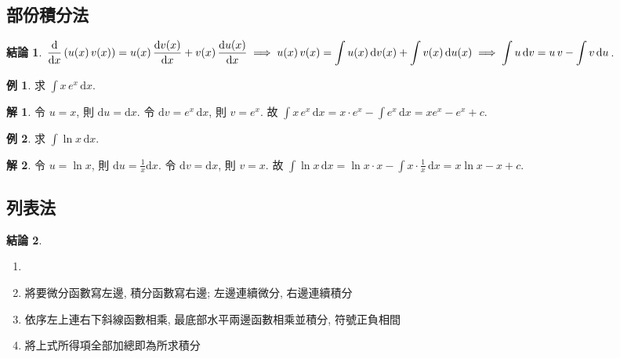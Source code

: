 \documentclass[12pt,a4paper]{extarticle}
\newcommand{\ds}{\displaystyle}
\newcommand{\ie}{\;\Longrightarrow\;}
\theoremstyle{definition}
\newtheorem*{fact}{結論}
\newtheorem*{ex}{例}
\newtheorem*{sol}{解}
\begin{document}
\subsection*{部份積分法}

\begin{fact}
  $\ds\frac{\mathrm{d}}{\mathrm{d}x}\,(u(x)\,v(x)) = u(x)\,\frac{\mathrm{d}v(x)}{\mathrm{d}x} + v(x)\,\frac{\mathrm{d}u(x)}{\mathrm{d}x}\ie u(x)\,v(x) = \int u(x)\,\mathrm{d}v(x) + \int v(x)\,\mathrm{d}u(x) \\ \ie \int u\,\text{d}v = u\,v - \int v\,\text{d}u$. 
\end{fact}

\begin{ex}
  求 $\ds\int x\, e^{x}\,\mathrm{d}x$. 
\end{ex}

\begin{sol}
  令 $u = x$, 則 $\ds\mathrm{d}u = \mathrm{d}x$. 令 $\ds\mathrm{d}v = e^x\,\mathrm{d}x$, 則 $\ds v = e^x$. 故 $\ds\int x\, e^{x}\,\mathrm{d}x = x\cdot e^x - \int e^x\,\mathrm{d}x = xe^x - e^x + c$. 
\end{sol}
    
\begin{ex}
  求 $\ds\int\!\ln x\,\mathrm{d}x$. 
\end{ex}

\begin{sol}
  令 $\ds u = \ln x$, 則 $\ds\mathrm{d}u = \frac{1}{x}\mathrm{d}x$. 令 $\ds\mathrm{d}v = \mathrm{d}x$, 則 $v = x$. 故 $\ds\int\!\ln x\,\mathrm{d}x = \ln x \cdot x - \int x\cdot\frac{1}{x}\,\mathrm{d}x = x\ln x - x + c$. 
\end{sol}

\subsection*{列表法}

\begin{fact}
  \begin{enumerate}\setlength{\itemsep}{0pt}
    \item[]
    \item 將要微分函數寫左邊, 積分函數寫右邊; 左邊連續微分, 右邊連續積分
    \item 依序左上連右下斜線函數相乘, 最底部水平兩邊函數相乘並積分, 符號正負相間
    \item 將上式所得項全部加總即為所求積分
  \end{enumerate}
\end{fact}
\end{document}
